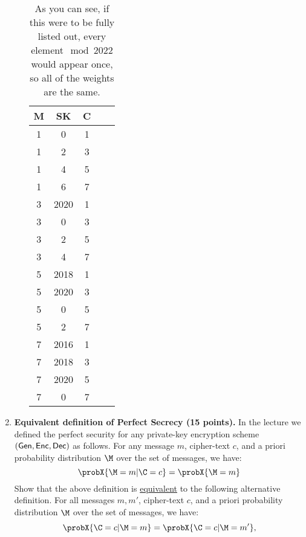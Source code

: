 \documentclass[11pt]{article}
\begin{document}
\begin{enumerate}
\begin{enumerate}
{    \begin{table}[htb]
      \centering
      \caption{As you can see, if this were to be fully listed out, every element$\mod2022$ would appear once, so all of the weights are the same.}
      \begin{tabular}{|c|c|c|c|c|}
        \hline
        \bfseries{M} & \bfseries{SK} & \bfseries{C}  \\ \hline
       1 & 0 & 1  \\ \hline
       1 & 2 & 3  \\ \hline
       1 & 4 & 5  \\ \hline
       1 & 6 & 7  \\ \hline
       3 & 2020 & 1  \\ \hline
       3 & 0 & 3  \\ \hline
       3 & 2 & 5  \\ \hline
       3 & 4 & 7  \\ \hline
       5 & 2018  & 1  \\ \hline
       5 & 2020  & 3  \\ \hline
       5 & 0 & 5  \\ \hline
       5 & 2 & 7  \\ \hline
       7 & 2016  & 1  \\ \hline
       7 & 2018  & 3  \\ \hline
       7 & 2020  & 5  \\ \hline
       7 & 0 & 7  \\ \hline
      \end{tabular}
    \end{table}
    }
     
\end{enumerate}

\newpage

\item {\bfseries Equivalent definition of Perfect Secrecy (15 points).} 
In the lecture we defined the perfect security for any private-key encryption scheme $(\mathsf{Gen},\mathsf{Enc},\mathsf{Dec})$ as follows. 
For any message $m$, cipher-text $c$, and a priori probability distribution $\M$ over the set of messages, we have: 
$$ \probX{ \M=m \vert \C=c } = \probX{\M=m}$$
Show that the above definition is \underline{equivalent} to the following alternative definition.  
For all messages $m,m'$, cipher-text $c$, and a priori probability distribution $\M$ over the set of messages, we have: 
$$ \probX{\C=c \vert \M=m} = \probX{\C = c \vert \M=m'},$$


\end{enumerate}
\end{document}
